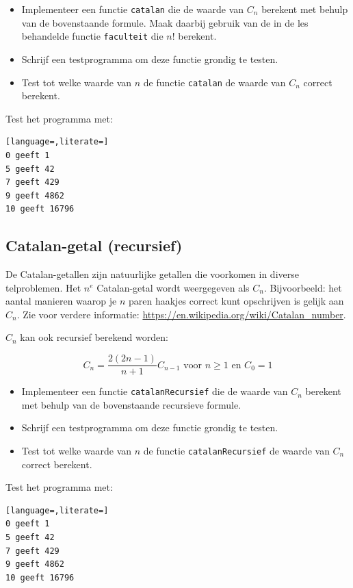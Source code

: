 \documentclass[a4paper,10pt,fleqn,twoside]{article}
\begin{document}
\begin{itemize}
\item Implementeer een functie \lstinline|catalan| die de waarde van $C_n$ berekent met behulp van de bovenstaande formule. Maak daarbij gebruik van de in de les behandelde functie \lstinline|faculteit| die $n!$ berekent.
\item Schrijf een testprogramma om deze functie grondig te testen.
\item Test tot welke waarde van $n$ de functie \lstinline|catalan| de waarde van $C_n$ correct berekent.
\end{itemize}

Test het programma met:

\begin{lstlisting}[language=,literate=]
0 geeft 1
5 geeft 42
7 geeft 429
9 geeft 4862
10 geeft 16796
\end{lstlisting}

\subsection{Catalan-getal (recursief)}
De Catalan-getallen zijn natuurlijke getallen die voorkomen in diverse telproblemen. Het $n^e$ Catalan-getal wordt weergegeven als $C_n$. Bijvoorbeeld: het aantal manieren waarop je $n$ paren haakjes correct kunt opschrijven is gelijk aan $C_n$. Zie voor verdere informatie: \url{https://en.wikipedia.org/wiki/Catalan_number}.

$C_n$ kan ook recursief berekend worden:

\begin{equation*}
C_n = \dfrac{2(2n-1)}{n+1}C_{n-1} \text{ voor } n \geq 1 \text{ en } C_0=1
\end{equation*}

\begin{itemize}
\item Implementeer een functie \lstinline|catalanRecursief| die de waarde van $C_n$ berekent met behulp van de bovenstaande recursieve formule.
\item Schrijf een testprogramma om deze functie grondig te testen.
\item Test tot welke waarde van $n$ de functie \lstinline|catalanRecursief| de waarde van $C_n$ correct berekent.
\end{itemize}

Test het programma met:

\begin{lstlisting}[language=,literate=]
0 geeft 1
5 geeft 42
7 geeft 429
9 geeft 4862
10 geeft 16796
\end{lstlisting}
\end{document}

